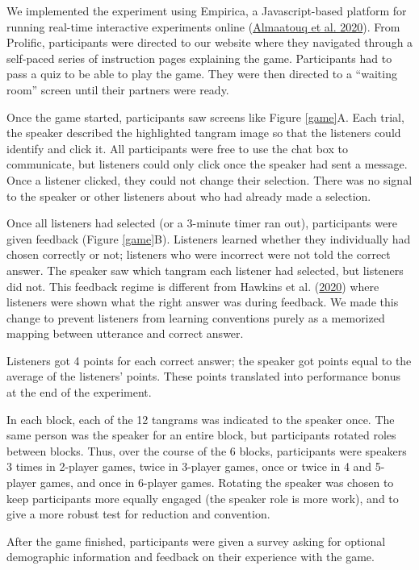 \documentclass[
  english,
  a4paper,
]{article}
\begin{document}
We implemented the experiment using Empirica, a Javascript-based platform for running real-time interactive experiments online (\protect\hyperlink{ref-almaatouqEmpiricaVirtualLab2020}{Almaatouq et al. 2020}). From Prolific, participants were directed to our website where they navigated through a self-paced series of instruction pages explaining the game. Participants had to pass a quiz to be able to play the game. They were then directed to a ``waiting room'' screen until their partners were ready.

Once the game started, participants saw screens like Figure \ref{game}A. Each trial, the speaker described the highlighted tangram image so that the listeners could identify and click it. All participants were free to use the chat box to communicate, but listeners could only click once the speaker had sent a message. Once a listener clicked, they could not change their selection. There was no signal to the speaker or other listeners about who had already made a selection.

Once all listeners had selected (or a 3-minute timer ran out), participants were given feedback (Figure \ref{game}B). Listeners learned whether they individually had chosen correctly or not; listeners who were incorrect were not told the correct answer. The speaker saw which tangram each listener had selected, but listeners did not. This feedback regime is different from Hawkins et al. (\protect\hyperlink{ref-hawkinsCharacterizingDynamicsLearning2020}{2020}) where listeners were shown what the right answer was during feedback. We made this change to prevent listeners from learning conventions purely as a memorized mapping between utterance and correct answer.

Listeners got 4 points for each correct answer; the speaker got points equal to the average of the listeners' points. These points translated into performance bonus at the end of the experiment.

In each block, each of the 12 tangrams was indicated to the speaker once. The same person was the speaker for an entire block, but participants rotated roles between blocks. Thus, over the course of the 6 blocks, participants were speakers 3 times in 2-player games, twice in 3-player games, once or twice in 4 and 5-player games, and once in 6-player games. Rotating the speaker was chosen to keep participants more equally engaged (the speaker role is more work), and to give a more robust test for reduction and convention.

After the game finished, participants were given a survey asking for optional demographic information and feedback on their experience with the game.
\end{document}
